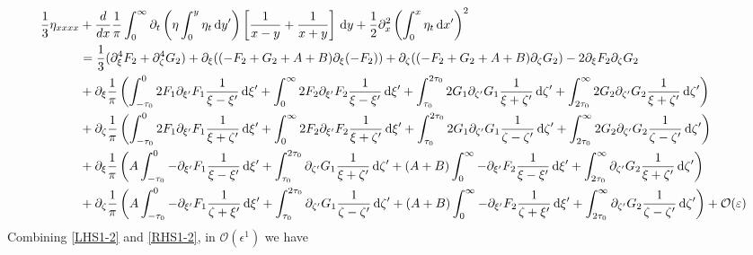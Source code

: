 \documentclass[10pt,reqno,oneside,a4paper, landscape]{article}
\begin{document}
\begin{align}
\frac{1}{3} \eta_{xxxx} &+ \frac{d}{dx} \frac{1}{\pi} \int_0^\infty \partial_t \left( \eta \int^{y}_0\eta_{t} \,\mathrm{d} y' \right) \left[ \frac{1}{x-y} + \frac{1}{x+y} \right] \,\mathrm{d} y + \frac{1}{2} \partial^2_x\left(\int^{x}_0\eta_{t} \,\mathrm{d} x' \right)^2 \nonumber\\
&=  \frac{1}{3}(\partial_\xi^4 F_2 + \partial_\zeta^4 G_2) + \partial_\xi ((-F_2 + G_2 + A +B)\partial_\xi(-F_2)) + \partial_\zeta ((-F_2 + G_2 + A +B)\partial_\zeta G_2) - 2 \partial_\xi F_2 \partial_\zeta G_2\nonumber \\
&+ \partial_\xi\frac{1}{\pi}
\left( \int^0_{-\tau_0} 2 F_1 \partial_{\xi'} F_1 \frac{1}{\xi -\xi'} \,\mathrm{d} \xi' + \int^{\infty}_{0} 2 F_2 \partial_{\xi'} F_2 \frac{1}{\xi -\xi'} \,\mathrm{d} \xi' + \int^{2\tau_0}_{\tau_0} 2 G_1 \partial_{\zeta'} G_1 \frac{1}{\xi + \zeta'} \,\mathrm{d} \zeta' + \int^{\infty}_{2\tau_0} 2 G_2 \partial_{\zeta'} G_2 \frac{1}{\xi + \zeta'} \,\mathrm{d} \zeta' \right) \nonumber\\
&+ \partial_\zeta\frac{1}{\pi} \left( \int^0_{-\tau_0} 2 F_1 \partial_{\xi'} F_1 \frac{1}{\xi + \zeta'} \,\mathrm{d} \xi' + \int^{\infty}_{0} 2 F_2 \partial_{\xi'} F_2 \frac{1}{\xi + \zeta'} \,\mathrm{d} \xi' + \int^{2\tau_0}_{\tau_0} 2 G_1 \partial_{\zeta'} G_1 \frac{1}{\zeta -\zeta'} \,\mathrm{d} \zeta' + \int^{\infty}_{2\tau_0} 2 G_2 \partial_{\zeta'} G_2 \frac{1}{\zeta -\zeta'} \,\mathrm{d} \zeta' \right)\nonumber \\
&+ \partial_\xi \frac{1}{\pi} \left( A \int^0_{-\tau_0} -\partial_{\xi'}F_1 \frac{1}{\xi - \xi'} \,\mathrm{d} \xi' + \int^{2\tau_0}_{\tau_0} \partial_{\zeta'} G_1 \frac{1}{\xi + \zeta'} \,\mathrm{d} \zeta' + (A+B)\int_0^{\infty} -\partial_{\xi'} F_2 \frac{1}{\xi - \xi'} \,\mathrm{d} \xi' + \int_{2\tau_0}^{\infty} \partial_{\zeta'} G_2 \frac{1}{\xi + \zeta'} \,\mathrm{d} \zeta' \right) \nonumber \\
&+ \partial_\zeta \frac{1}{\pi} \left( A \int^0_{-\tau_0} -\partial_{\xi'} F_1  \frac{1}{\zeta + \xi'}  \,\mathrm{d} \xi' + \int^{2\tau_0}_{\tau_0} \partial_{\zeta'} G_1 \frac{1}{\zeta - \zeta'} \,\mathrm{d} \zeta' + (A+B) \int_0^{\infty} -\partial_{\xi'} F_2  \frac{1}{\zeta + \xi'} \,\mathrm{d} \xi'  + \int_{2\tau_0}^{\infty} \partial_{\zeta'} G_2 \frac{1}{\zeta - \zeta'}\,\mathrm{d} \zeta' \right) + \mathcal{O}(\varepsilon) \label{RHS1-2}
\end{align}
Combining \eqref{LHS1-2} and \eqref{RHS1-2}, in $\mathcal{O}(\epsilon^1)$ we have
\end{document}
